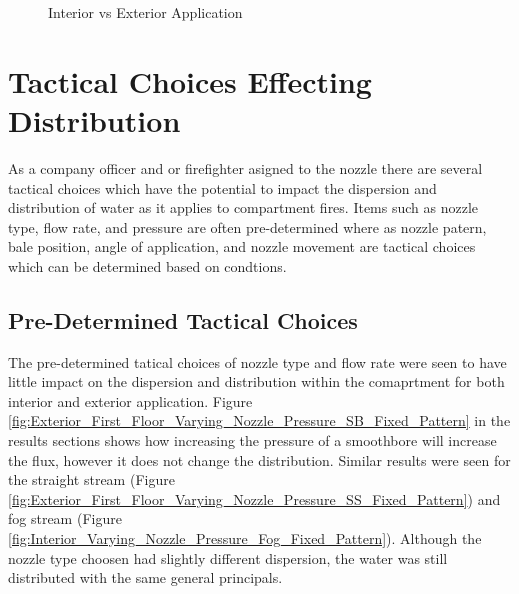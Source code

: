 \documentclass[12pt,oneside]{book}
\begin{document}
\begin{figure}[H]
\centering
{}
\caption{Interior vs Exterior Application}
\label{fig:Interior_vs_Exterior}
\end{figure}

\section{Tactical Choices Effecting Distribution}

As a company officer and or firefighter asigned to the nozzle there are several tactical choices which have the potential to impact the dispersion and distribution of water as it applies to compartment fires. Items such as nozzle type, flow rate, and pressure are often pre-determined where as nozzle patern, bale position, angle of application, and nozzle movement are tactical choices which can be determined based on condtions.  

\subsection{Pre-Determined Tactical Choices}
The pre-determined tatical choices of nozzle type and flow rate were seen to have little impact on the dispersion and distribution within the comaprtment for both interior and exterior application. Figure \ref{fig:Exterior_First_Floor_Varying_Nozzle_Pressure_SB_Fixed_Pattern} in the results sections shows how increasing the pressure of a smoothbore will increase the flux, however it does not change the distribution. Similar results were seen for the straight stream (Figure \ref{fig:Exterior_First_Floor_Varying_Nozzle_Pressure_SS_Fixed_Pattern}) and fog stream (Figure \ref{fig:Interior_Varying_Nozzle_Pressure_Fog_Fixed_Pattern}). Although the nozzle type choosen had slightly different dispersion, the water was still distributed with the same general principals. 
\end{document}
